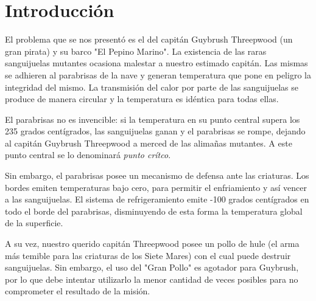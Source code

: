 
\lstset{escapechar=@,style=customc}




\fecha{\today}




\maketitle

\tableofcontents
\newpage

\section*{Introducción}

El problema que se nos presentó es el del capitán Guybrush Threepwood (un gran pirata) y su barco "El Pepino Marino". La existencia de las raras sanguijuelas mutantes ocasiona malestar a nuestro estimado capitán. Las mismas se adhieren al parabrisas de la nave y generan temperatura que pone en peligro la integridad del mismo. La transmisión del calor por parte de las sanguijuelas se produce de manera circular y la temperatura es idéntica para todas ellas. 
\par 
El parabrisas no es invencible: si la temperatura en su punto central supera los 235 grados centígrados, las sanguijuelas ganan y el parabrisas se rompe, dejando al capitán Guybrush Threepwood a merced de las alimañas mutantes. A este punto central se lo denominará \textit{punto crítco}.
\par 
Sin embargo, el parabrisas posee un mecanismo de defensa ante las criaturas. Los bordes emiten temperaturas bajo cero, para permitir el enfriamiento y así vencer a las sanguijuelas. El sistema de refrigeramiento emite -100 grados centígrados en todo el borde del parabrisas, disminuyendo de esta forma la temperatura global de la superficie. 
\par 
A su vez, nuestro querido capitán Threepwood posee un pollo de hule (el arma más temible para las criaturas de los Siete Mares) con el cual puede destruir sanguijuelas. Sin embargo, el uso del "Gran Pollo" es agotador para Guybrush, por lo que debe intentar utilizarlo la menor cantidad de veces posibles para no comprometer el resultado de la misión. 

